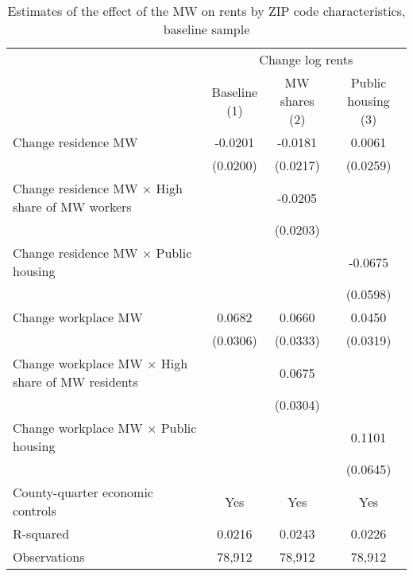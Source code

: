 \begin{table}[hbt!] \centering
    \caption{Estimates of the effect of the MW on rents by ZIP code characteristics, baseline sample}
    \label{tab:heterogeneity}
    \begin{tabular}{@{}lccc@{}}
        \toprule
            & \multicolumn{3}{c}{Change log rents}                                                  \\ \cmidrule(l){2-4} 
            & \shortstack{Baseline\\(1)} 
            & \shortstack{MW shares\\(2)}                                             
            & \shortstack{Public housing\\(3)}                                                      \\ \midrule
        Change residence MW                                     &  -0.0201   &  -0.0181  &  0.0061   \\
                                                                & (0.0200)  & (0.0217) & (0.0259)  \\
        Change residence MW $\times$ High share of MW workers   &        &  -0.0205  &        \\
                                                                &        & (0.0203) &        \\
        Change residence MW $\times$ Public housing             &        &       &  -0.0675   \\
                                                                &        &       & (0.0598)  \\
        Change workplace MW                                     &  0.0682   &  0.0660  &  0.0450   \\
                                                                & (0.0306)  & (0.0333) & (0.0319)  \\
        Change workplace MW $\times$ High share of MW residents &        &  0.0675  &        \\
                                                                &        & (0.0304) &        \\
        Change workplace MW $\times$ Public housing             &        &       &  0.1101   \\
                                                                &        &       & (0.0645)  \\
        County-quarter economic controls                        &  Yes   &  Yes  &   Yes  \\
        R-squared                                               &  0.0216   &  0.0243  &   0.0226  \\
        Observations                                            &  78,912  &  78,912 &   78,912 \\ \bottomrule
    \end{tabular}


\end{table}
